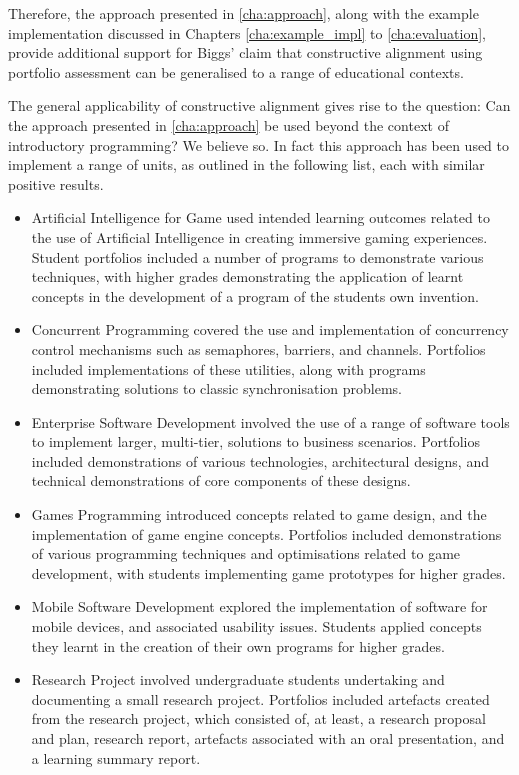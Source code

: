 Therefore, the approach presented in \cref{cha:approach}, along with the example implementation discussed in Chapters \ref{cha:example_impl} to \ref{cha:evaluation}, provide additional support for Biggs' claim that constructive alignment using portfolio assessment can be generalised to a range of educational contexts. 

The general applicability of constructive alignment gives rise to the question: Can the approach presented in \cref{cha:approach} be used beyond the context of introductory programming? We believe so. In fact this approach has been used to implement a range of units, as outlined in the following list, each with similar positive results.

\begin{itemize}[noitemsep,nolistsep]
	\item Artificial Intelligence for Game used intended learning outcomes related to the use of Artificial Intelligence in creating immersive gaming experiences. Student portfolios included a number of programs to demonstrate various techniques, with higher grades demonstrating the application of learnt concepts in the development of a program of the students own invention.
	\item Concurrent Programming covered the use and implementation of concurrency control mechanisms such as semaphores, barriers, and channels. Portfolios included implementations of these utilities, along with programs demonstrating solutions to classic synchronisation problems.   
	\item Enterprise Software Development involved the use of a range of software tools to implement larger, multi-tier, solutions to business scenarios. Portfolios included demonstrations of various technologies, architectural designs, and technical demonstrations of core components of these designs.
	\item Games Programming introduced concepts related to game design, and the implementation of game engine concepts. Portfolios included demonstrations of various programming techniques and optimisations related to game development, with students implementing game prototypes for higher grades.
	\item Mobile Software Development explored the implementation of software for mobile devices, and associated usability issues. Students applied concepts they learnt in the creation of their own programs for higher grades.
	\item Research Project involved undergraduate students undertaking and documenting a small research project. Portfolios included artefacts created from the research project, which consisted of, at least, a research proposal and plan, research report, artefacts associated with an oral presentation, and a learning summary report. 
\end{itemize}

